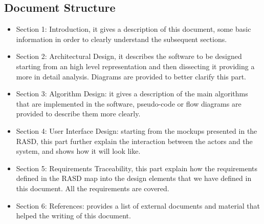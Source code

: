 \subsection{Document Structure}
\begin{itemize}
	\item Section 1: Introduction, it gives a description of this document, some basic information in order to clearly understand the subsequent sections.
	\item Section 2: Architectural Design, it describes the software to be designed starting from an high level representation and then dissecting it providing a more in detail analysis. Diagrams are provided to better clarify this part.
	\item Section 3: Algorithm Design: it gives a description of the main algorithms that are implemented in the software, pseudo-code or flow diagrams are provided to describe them more clearly.
	\item Section 4: User Interface Design: starting from the mockups presented in the RASD, this part further explain the interaction between the actors and the system, and shows how it will look like.
	\item Section 5: Requirements Traceability, this part explain how the requirements defined in the RASD map into the design elements that we have defined in this document. All the requirements are covered.
	\item Section 6: References: provides a list of external documents and material that helped the writing of this document.
\end{itemize}